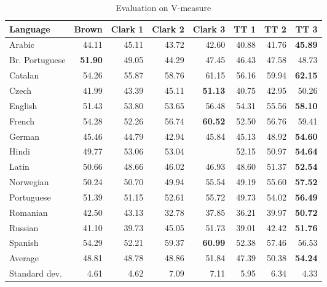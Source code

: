 \documentclass[11pt]{article}
\begin{document}
{\begin{table}
\scriptsize
\centering
\begin{tabular}{l|r|r|r|r|r|r|r}
\bf Language & \bf Brown &\bf Clark 1 & \bf Clark 2 & \bf Clark 3 & \bf TT 1 & \bf TT 2 & \bf TT 3 \\
\hline
Arabic & 44.11 & 45.11 & 43.72 & 42.60 & 40.88 & 41.76 &\bf 45.89 \\
Br. Portuguese & \bf 51.90 & 49.05 & 44.29 & 47.45 & 46.43 & 47.58 & 48.73 \\
Catalan & 54.26 & 55.87 & 58.76 & 61.15 & 56.16 & 59.94 &\bf 62.15 \\
Czech & 41.99 & 43.39 & 45.11 & \bf 51.13 & 40.75 & 42.95 & 50.26 \\
English & 51.43 & 53.80 & 53.65 & 56.48 & 54.31 & 55.56 & \bf 58.10 \\
French & 54.28 & 52.26 & 56.74 & \bf 60.52 & 52.50 & 56.76 & 59.41 \\
German & 45.46 & 44.79 & 42.94 & 45.84 & 45.13 & 48.92 & \bf 54.60 \\
Hindi & 49.77 & 53.06 & 53.04 &  & 52.15 & 50.97 & \bf 54.64 \\
Latin & 50.66 & 48.66 & 46.02 & 46.93 & 48.60 & 51.37 & \bf 52.54 \\
Norwegian & 50.24 & 50.70 & 49.94 & 55.54 & 49.19 & 55.60 & \bf 57.52 \\
Portuguese & 51.39 & 51.15 & 52.61 & 55.72 & 49.73 & 54.02 & \bf 56.49 \\
Romanian & 42.50 & 43.13 & 32.78 & 37.85 & 36.21 & 39.97 & \bf 50.72 \\
Russian & 41.10 & 39.73 & 45.05 & 51.73 & 39.01 & 42.42 &\bf 51.76 \\
Spanish & 54.29 & 52.21 & 59.37 &\bf 60.99 & 52.38 & 57.46 & 56.53 \\
\hline
Average & 48.81 & 48.78 & 48.86 & 51.84 & 47.39 & 50.38 & \bf 54.24 \\
Standard dev. & 4.61 & 4.62 & 7.09 & 7.11 & 5.95 & 6.34 & 4.33 \\
\end{tabular}
\caption{Evaluation on V-measure}\label{vmeasure}
\end{table}

}
\end{document}
